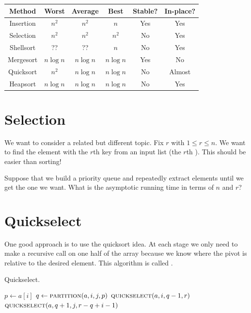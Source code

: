 \begin{center}
\begin{tabular}{|c|c|c|c|c|c|} \hline 
Method & Worst & Average & Best & Stable? & In-place? \\
\hline
Insertion & $n^2$ & $n^2$ & $n$ & Yes & Yes \\
Selection & $n^2$ & $n^2$ & $n^2$ & No & Yes \\
Shellsort & ?? & ?? & $n$ & No & Yes \\
Mergesort & $n \log n$ & $n \log n$ & $n \log n$ & Yes & No \\
Quicksort & $n^2$ & $n \log n$ & $n \log n$ & No & Almost \\
Heapsort & $n \log n$ & $n \log n$ & $n \log n$ & No & Yes \\
\hline
\end{tabular}
\end{center}


\section{Selection}
We want to consider a related but different topic. Fix $r$ with $1\leq r \leq n$. 
We want to find the element with the $r$th key from an input list (the $r$th ). 
This should be easier than sorting! 

\begin{Boxample}[5]
Suppose that we build a priority queue and repeatedly extract elements until we get the one we want.
What is the asymptotic running time in terms of $n$ and $r$?

\end{Boxample}

\section{Quickselect}
One good approach is to use the quicksort idea. At each stage we only need to 
make a recursive call on one half of the array because we know where the pivot 
is relative to the desired element. This algorithm is called .

\begin{algorithm}[H]
  \caption{Quickselect.}
  \label{alg:quickselect}
\begin{algorithmic}[0]
		\State $p \gets a[i]$ 
		\State $q \gets \Call{partition}{a, i,j,p}$ 
			\State {}
			\State $\Call{quickselect}{a,i,q-1,r}$ 
		\Else{}
			\State $\Call{quickselect}{a,q+1,j,r-q+i-1}$ 
		\EndIf
	\EndIf
\EndFunction  
\end{algorithmic}
\end{algorithm}

